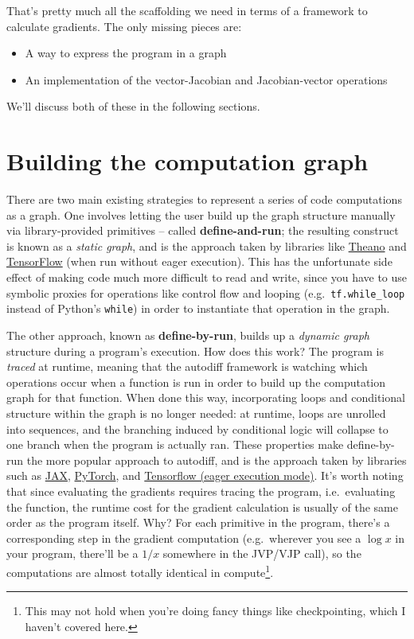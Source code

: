 \documentclass[
  11pt,
  numbers=noendperiod]{book}
\providecommand{\tightlist}{%
  \setlength{\itemsep}{0pt}\setlength{\parskip}{0pt}}\usepackage{longtable,booktabs,array}
\begin{document}
That's pretty much all the scaffolding we need in terms of a framework
to calculate gradients. The only missing pieces are:

\begin{itemize}
\tightlist
\item
  A way to express the program in a graph
\item
  An implementation of the vector-Jacobian and Jacobian-vector
  operations
\end{itemize}

We'll discuss both of these in the following sections.

\hypertarget{building-the-computation-graph}{%
\section{Building the computation
graph}\label{building-the-computation-graph}}

There are two main existing strategies to represent a series of code
computations as a graph. One involves letting the user build up the
graph structure manually via library-provided primitives -- called
\textbf{define-and-run}; the resulting construct is known as a
\emph{static graph}, and is the approach taken by libraries like
\href{https://github.com/Theano/Theano}{Theano} and
\href{https://github.com/google/tensorflow}{TensorFlow} (when run
without eager execution). This has the unfortunate side effect of making
code much more difficult to read and write, since you have to use
symbolic proxies for operations like control flow and looping
(e.g.~\texttt{tf.while\_loop} instead of Python's \texttt{while}) in
order to instantiate that operation in the graph.

The other approach, known as \textbf{define-by-run}, builds up a
\emph{dynamic graph} structure during a program's execution. How does
this work? The program is \emph{traced} at runtime, meaning that the
autodiff framework is watching which operations occur when a function is
run in order to build up the computation graph for that function. When
done this way, incorporating loops and conditional structure within the
graph is no longer needed: at runtime, loops are unrolled into
sequences, and the branching induced by conditional logic will collapse
to one branch when the program is actually ran. These properties make
define-by-run the more popular approach to autodiff, and is the approach
taken by libraries such as \href{https://github.com/google/jax}{JAX},
\href{https://github.com/pytorch/pytorch}{PyTorch}, and
\href{https://ai.googleblog.com/2017/10/eager-execution-imperative-define-by.html}{Tensorflow
(eager execution mode)}. It's worth noting that since evaluating the
gradients requires tracing the program, i.e.~evaluating the function,
the runtime cost for the gradient calculation is usually of the same
order as the program itself. Why? For each primitive in the program,
there's a corresponding step in the gradient computation (e.g.~wherever
you see a \(\log{x}\) in your program, there'll be a \(1/x\) somewhere
in the JVP/VJP call), so the computations are almost totally identical
in compute\footnote{This may not hold when you're doing fancy things
  like checkpointing, which I haven't covered here.}.
\end{document}
